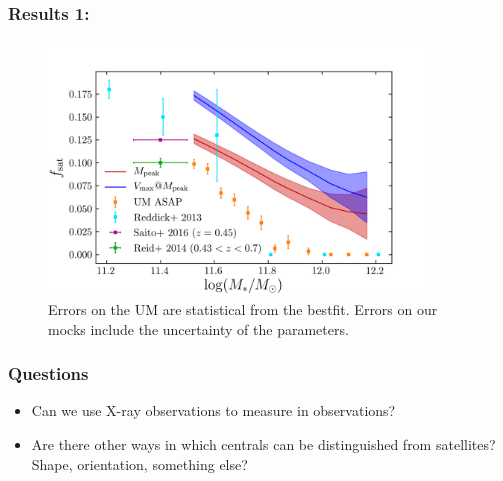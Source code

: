 \documentclass[t]{beamer}
\begin{document}
\begin{frame}
    \frametitle{Results 1: \fsat{}}

    \begin{figure}
    \includegraphics[width=0.9\textwidth]{images/sat_frac.png}
    \caption{Errors on the UM are statistical from the bestfit. Errors on our mocks include the uncertainty of the parameters.}
    \end{figure}
\end{frame}

\begin{frame}
    \frametitle{Questions}
    \begin{itemize}
        \item{Can we use X-ray observations to measure \fsat{} in observations?}
        \item{Are there other ways in which centrals can be distinguished from satellites? Shape, orientation, something else?}
    \end{itemize}
\end{frame}
\end{document}

